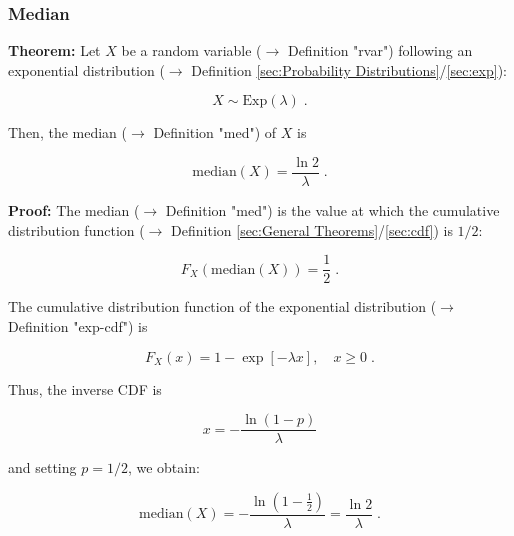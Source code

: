 \documentclass[a4paper,12pt]{book}
\begin{document}
\subsubsection[\textbf{Median}]{Median} \label{sec:exp-med}

\vspace{1em}
\textbf{Theorem:} Let $X$ be a random variable ($\rightarrow$ Definition "rvar") following an exponential distribution ($\rightarrow$ Definition \ref{sec:Probability Distributions}/\ref{sec:exp}):

\begin{equation} \label{eq:exp-med-exp}
X \sim \mathrm{Exp}(\lambda) \; .
\end{equation}

Then, the median ($\rightarrow$ Definition "med") of $X$ is

\begin{equation} \label{eq:exp-med-exp-med}
\mathrm{median}(X) = \frac{\ln 2}{\lambda} \; .
\end{equation}


\vspace{1em}
\textbf{Proof:} The median ($\rightarrow$ Definition "med") is the value at which the cumulative distribution function ($\rightarrow$ Definition \ref{sec:General Theorems}/\ref{sec:cdf}) is $1/2$:

\begin{equation} \label{eq:exp-med-median}
F_X(\mathrm{median}(X)) = \frac{1}{2} \; .
\end{equation}

The cumulative distribution function of the exponential distribution ($\rightarrow$ Definition "exp-cdf") is

\begin{equation} \label{eq:exp-med-exp-cdf}
F_X(x) = 1 - \exp[-\lambda x], \quad x \geq 0 \; .
\end{equation}

Thus, the inverse CDF is

\begin{equation} \label{eq:exp-med-exp-cdf-inv}
x = -\frac{\ln(1-p)}{\lambda}
\end{equation}

and setting $p = 1/2$, we obtain:

\begin{equation} \label{eq:exp-med-exp-med-qed}
\mathrm{median}(X) = -\frac{\ln(1-\frac{1}{2})}{\lambda} = \frac{\ln 2}{\lambda} \; .
\end{equation}
\end{document}

